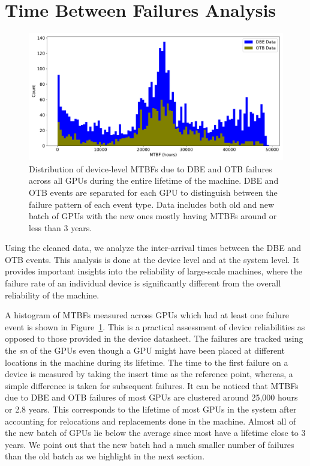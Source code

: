 \section{Time Between Failures Analysis}
\label{section:tbf}

\begin{figure}[bt]
  \begin{center}
    \includegraphics[trim={0 1em 0 1em},clip,width=\columnwidth]{figs/MTBF_GPUwise.pdf}
  \end{center}
  \caption{Distribution of device-level MTBFs due to DBE and OTB failures across all GPUs during the
entire lifetime of the machine. DBE and OTB events are separated for each GPU to distinguish between 
the failure pattern of each event type. Data includes both old and new batch of GPUs with the new ones 
mostly having MTBFs around or less than 3 years.}
  \label{fig:Device_MTBFs}
\end{figure}

Using the cleaned data, we analyze the inter-arrival times between the DBE and OTB events. 
This analysis is done at the device level and at the system level. 
It provides important insights into the reliability of large-scale machines, where the 
failure rate of an individual device is significantly different from the overall reliability
of the machine.  

A histogram of MTBFs measured across GPUs which had at least one failure event is shown 
in Figure~\ref{fig:Device_MTBFs}. This is a practical assessment of device reliabilities 
as opposed to those provided in the device datasheet. The failures are tracked using the
{\em sn} of the GPUs even though a GPU might have been placed at different locations in the 
machine during its lifetime. The time to the first failure on a device is measured by taking
the insert time as the reference point, whereas, a simple difference is taken for subsequent
failures. It can be noticed that MTBFs due to DBE and OTB failures of most GPUs are clustered around 
25,000 hours or 2.8 years. This corresponds to the lifetime of most GPUs in the system after accounting 
for relocations and replacements done in the machine. Almost all of the new batch of GPUs lie below 
the average since most have a lifetime close to 3 years. We point out
that the new batch had a much smaller number of failures than
the old batch as we highlight in the next section.

